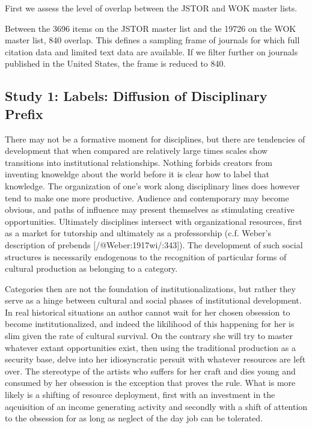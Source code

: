 \documentclass[]{article}
\begin{document}
First we assess the level of overlap between the JSTOR and WOK master
lists.

Between the 3696 items on the JSTOR master list and the 19726 on the WOK
master list, 840 overlap. This defines a sampling frame of journals for
which full citation data and limited text data are available. If we
filter further on journals published in the United States, the frame is
reduced to 840.

\subsection{Study 1: Labels: Diffusion of Disciplinary
Prefix}\label{study-1-labels-diffusion-of-disciplinary-prefix}

There may not be a formative moment for disciplines, but there are
tendencies of development that when compared are relatively large times
scales show transitions into institutional relationships. Nothing
forbids creators from inventing knoweldge about the world before it is
clear how to label that knowledge. The organization of one's work along
disciplinary lines does however tend to make one more productive.
Audience and contemporary may become obvious, and paths of influence may
present themselves as stimulating creative opportunities. Ultimately
disciplines intersect with organizational resources, first as a market
for tutorship and ultimately as a professorship (c.f. Weber's
description of prebends {[}/@Weber:1917wi/:343{]}). The development of
such social structures is necessarily endogenous to the recognition of
particular forms of cultural production as belonging to a category.

Categories then are not the foundation of institutionalizations, but
rather they serve as a hinge between cultural and social phases of
institutional development. In real historical situations an author
cannot wait for her chosen obsession to become institutionalized, and
indeed the likilihood of this happening for her is slim given the rate
of cultural survival. On the contrary she will try to master whatever
extant opportunities exist, then using the traditional production as a
security base, delve into her idiosyncratic persuit with whatever
resources are left over. The stereotype of the artists who suffers for
her craft and dies young and consumed by her obsession is the exception
that proves the rule. What is more likely is a shifting of resource
deployment, first with an investment in the aqcuisition of an income
generating activity and secondly with a shift of attention to the
obsession for as long as neglect of the day job can be tolerated.
\end{document}
